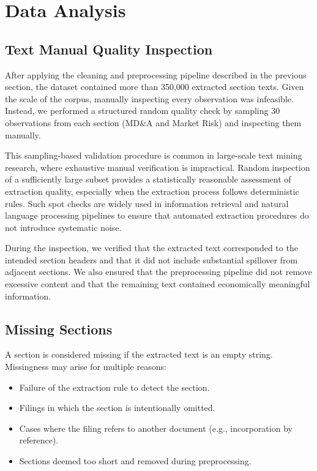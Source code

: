 \chapter{Data Analysis}

\section{Text Manual Quality Inspection}
\label{appendix:quality_inspection}

After applying the cleaning and preprocessing pipeline described in the previous section, the dataset contained more than 350,000 extracted section texts. Given the scale of the corpus, manually inspecting every observation was infeasible. Instead, we performed a structured random quality check by sampling 30 observations from each section (MD\&A and Market Risk) and inspecting them manually.

This sampling-based validation procedure is common in large-scale text mining research, where exhaustive manual verification is impractical. Random inspection of a sufficiently large subset provides a statistically reasonable assessment of extraction quality, especially when the extraction process follows deterministic rules. Such spot checks are widely used in information retrieval and natural language processing pipelines to ensure that automated extraction procedures do not introduce systematic noise.

During the inspection, we verified that the extracted text corresponded to the intended section headers and that it did not include substantial spillover from adjacent sections.
We also ensured that the preprocessing pipeline did not remove excessive content and that the remaining text contained economically meaningful information.

\section{Missing Sections}
\label{appendix:missing_sections}

A section is considered missing if the extracted text is an empty string. Missingness may arise for multiple reasons:
\begin{itemize}
    \item Failure of the extraction rule to detect the section.
    \item Filings in which the section is intentionally omitted.
    \item Cases where the filing refers to another document (e.g., incorporation by reference).
    \item Sections deemed too short and removed during preprocessing.
\end{itemize}


